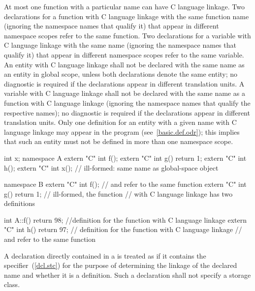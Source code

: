 \pnum
{}%
At most one function with a particular name can have C language linkage.
Two declarations for a function with C language linkage with the same
function name (ignoring the namespace names that qualify it) that appear
in different namespace scopes refer to the same function. Two
declarations for a variable with C language linkage with the same name
(ignoring the namespace names that qualify it) that appear in different
namespace scopes refer to the same variable.
An entity with C language linkage shall not be declared with the same name
as an entity in global scope, unless both declarations denote the same entity;
no diagnostic is required if the declarations appear in different translation units.
A variable with C language linkage shall not be declared with the same name as a
function with C language linkage (ignoring the namespace names that qualify the
respective names); no diagnostic is required if the declarations appear in
different translation units.
\enternote
Only
one definition for an entity with a given name
with C language linkage may appear in the
program (see~\ref{basic.def.odr});
this implies that such an entity
must not be defined in more
than one namespace scope.\exitnote
\enterexample

\begin{codeblock}
int x;
namespace A {
  extern "C" int f();
  extern "C" int g() { return 1; }
  extern "C" int h();
  extern "C" int x();               // ill-formed: same name as global-space object 
}

namespace B {
  extern "C" int f();               //  and  refer to the same function
  extern "C" int g() { return 1; }  // ill-formed, the function 
                                    // with C language linkage has two definitions
}

int A::f() { return 98; }           //definition for the function  with C language linkage
extern "C" int h() { return 97; }   // definition for the function  with C language linkage
                                    //  and  refer to the same function
\end{codeblock}
\exitexample

\pnum
A declaration directly contained in a
is treated as if it contains the
specifier~(\ref{dcl.stc}) for the purpose of determining the linkage of the
declared name and whether it is a definition. Such a declaration shall
not specify a storage class.
\enterexample

